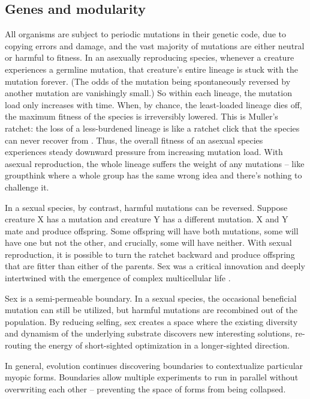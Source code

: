 \subsection{Genes and modularity}

All organisms are subject to periodic mutations in their genetic code, due to copying errors and damage, and the vast majority of mutations are either neutral or harmful to fitness. In an asexually reproducing species, whenever a creature experiences a germline mutation, that creature's entire lineage is stuck with the mutation forever. (The odds of the mutation being spontaneously reversed by another mutation are vanishingly small.) So within each lineage, the mutation load only increases with time. When, by chance, the least-loaded lineage dies off, the maximum fitness of the species is irreversibly lowered. This is Muller's ratchet: the loss of a less-burdened lineage is like a ratchet click that the species can never recover from \citep{keightley2006interference, muller1932some}. Thus, the overall fitness of an asexual species experiences steady downward pressure from increasing mutation load. With asexual reproduction, the whole lineage suffers the weight of any mutations -- like groupthink where a whole group has the same wrong idea and there's nothing to challenge it.

In a sexual species, by contrast, harmful mutations can be reversed. Suppose creature X has a mutation and creature Y has a different mutation. X and Y mate and produce offspring. Some offspring will have both mutations, some will have one but not the other, and crucially, some will have neither. With sexual reproduction, it is possible to turn the ratchet backward and produce offspring that are fitter than either of the parents. Sex was a critical innovation and deeply intertwined with the emergence of complex multicellular life \citep{butterfield2000bangiomorpha}.


Sex is a semi-permeable boundary. In a sexual species, the occasional beneficial mutation can still be utilized, but harmful mutations are recombined out of the population. By reducing selfing, sex creates a space where the existing diversity and dynamism of the underlying substrate discovers new interesting solutions, re-routing the energy of short-sighted optimization in a longer-sighted direction. 


In general, evolution continues discovering boundaries to contextualize particular myopic forms. Boundaries allow multiple experiments to run in parallel without overwriting each other -- preventing the space of forms from being collapsed. 

